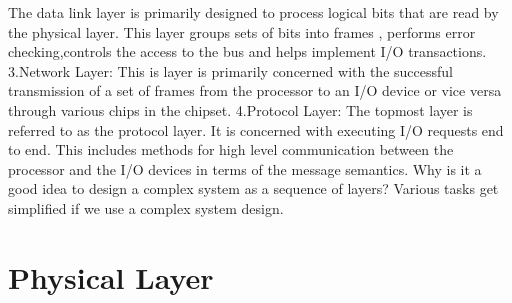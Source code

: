 \begin{ExerciseList}
The data link layer is primarily designed to process logical bits that are read by the physical layer. This layer groups sets of bits into frames , performs error checking,controls the access to the bus and helps implement I/O transactions.
3.Network Layer:
This is layer is primarily concerned with the successful transmission of a set of frames from the processor to an I/O device or vice versa through various chips in the chipset.
4.Protocol Layer:
The topmost layer is referred to as the protocol layer. It is concerned with executing I/O requests end to end. This includes methods for high level communication between the processor and the I/O devices in terms of the message semantics.
\Exercise
Why is it a good idea to design a complex system as a sequence of layers?
\Answer
Various tasks get simplified if we use a complex system design. 
\end{ExerciseList}

\section*{Physical Layer}

